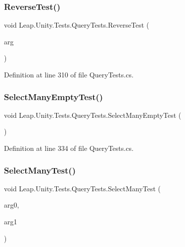 \subsubsection{\texorpdfstring{ReverseTest()}{ReverseTest()}}
{\footnotesize\ttfamily void Leap.\+Unity.\+Tests.\+Query\+Tests.\+Reverse\+Test (\begin{DoxyParamCaption}\item[{\mbox{[}\+Value\+Source(\char`\"{}list0\char`\"{})\mbox{]} \mbox{\hyperlink{class_leap_1_1_unity_1_1_tests_1_1_query_tests_1_1_query_arg}{Query\+Arg}}}]{arg }\end{DoxyParamCaption})}



Definition at line 310 of file Query\+Tests.\+cs.

\mbox{\label{class_leap_1_1_unity_1_1_tests_1_1_query_tests_a4c0a09f667832d9f452ce5a4e484eee0}} 
\subsubsection{\texorpdfstring{SelectManyEmptyTest()}{SelectManyEmptyTest()}}
{\footnotesize\ttfamily void Leap.\+Unity.\+Tests.\+Query\+Tests.\+Select\+Many\+Empty\+Test (\begin{DoxyParamCaption}{ }\end{DoxyParamCaption})}



Definition at line 334 of file Query\+Tests.\+cs.

\mbox{\label{class_leap_1_1_unity_1_1_tests_1_1_query_tests_ad189d8d7213ac96c7f8bf5eb26b608e0}} 
\subsubsection{\texorpdfstring{SelectManyTest()}{SelectManyTest()}}
{\footnotesize\ttfamily void Leap.\+Unity.\+Tests.\+Query\+Tests.\+Select\+Many\+Test (\begin{DoxyParamCaption}\item[{\mbox{[}\+Value\+Source(\char`\"{}list0\char`\"{})\mbox{]} \mbox{\hyperlink{class_leap_1_1_unity_1_1_tests_1_1_query_tests_1_1_query_arg}{Query\+Arg}}}]{arg0,  }\item[{\mbox{[}\+Value\+Source(\char`\"{}list0\char`\"{})\mbox{]} \mbox{\hyperlink{class_leap_1_1_unity_1_1_tests_1_1_query_tests_1_1_query_arg}{Query\+Arg}}}]{arg1 }\end{DoxyParamCaption})}



